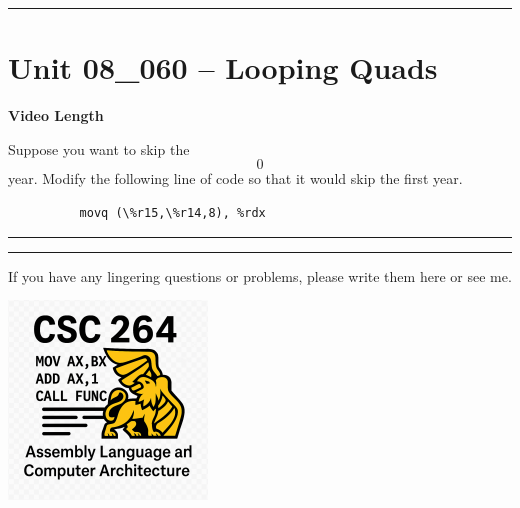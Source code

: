\documentclass[letterpaper,12pt]{exam}
\newcommand{\unit}{Unit 08}
\begin{document}
\begin{questions}
\rule{0.5\textwidth}{.4pt} %
\section*{\unit\_060 -- Looping Quads }
\par{\selectfont\textbf{Video Length }}
\begin{samepage}
    \question Suppose you want to skip the \[0\] year. Modify the following line of code so that it would skip the first year.
    \begin{verbatim}
          movq (\%r15,\%r14,8), %rdx
    \end{verbatim}
    \vspace{5mm}
\end{samepage}
\par
\rule{0.5\textwidth}{.4pt} %






\end{questions} 
\begin{center}
    \rule{0.667\textwidth}{.8pt} %
\end{center}


If you have any lingering questions or problems, please write them here or see me.
\vfill
\begin{center}
\includegraphics{../csc264Logo}
\end{center}
\end{document}
